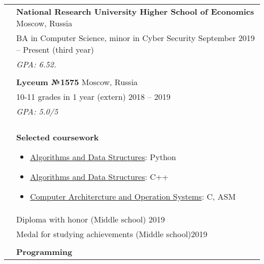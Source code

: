 \documentclass[letterpaper, 11pt]{article}
\begin{document}
\begin{longtable}{p{1.3in}p{4.8in}}




\color{OliveGreen}{Education} 
& \textbf{National Research University Higher School of Economics} \hfill Moscow, Russia\\
& BA in Computer Science, minor in Cyber Security \hfill September 2019 -- Present (third year) \\
& {\it GPA: 6.52.}\\
& \\

& \textbf{Lyceum №1575} \hfill Moscow, Russia\\
& 10-11 grades in 1 year (extern) \hfill 2018 -- 2019 \\
& {\it GPA: 5.0/5}\\
& \\

& \textbf{Selected coursework}
\begin{itemize}[noitemsep,leftmargin=*]
\item \underline{Algorithms and Data Structures}: Python
\item \underline{Algorithms and Data Structures}: C++
\item \underline{Computer Architercture and Operation Systems}: C, ASM
\end{itemize} \\


{\color{OliveGreen}{Honors and}} 
& Diploma with honor (Middle school) \hfill 2019\\
{\color{OliveGreen}{scholarships}} 
& Medal for studying achievements (Middle school)\hfill 2019 \\
& \\


{\color{OliveGreen}{Skills}} 
& \textbf{Programming}


\end{longtable}
\end{document}
